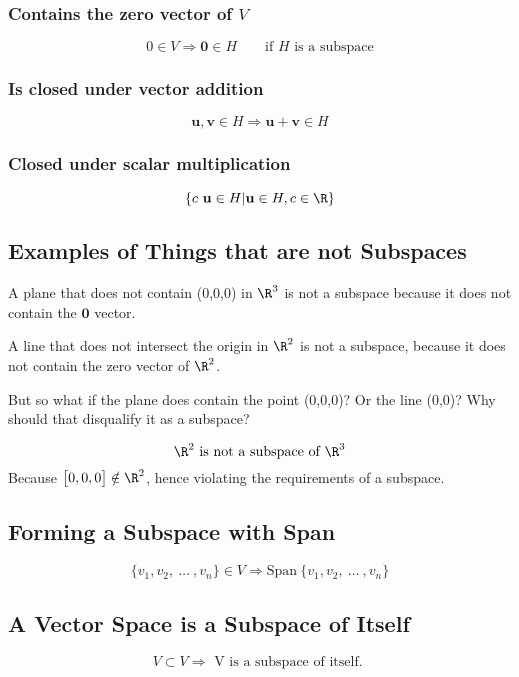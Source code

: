 \documentclass{article}
\begin{document}
\subsubsection{Contains the zero vector of $ V $} 
\[%
    0 \in V \Rightarrow \mathbf{0} \in H \qquad \text{if } H \text{ is a subspace}
\]%
\subsubsection{Is closed under vector addition} 
\[%
    \mathbf{u}, \mathbf{v} \in H \Rightarrow \mathbf{u}+ \mathbf{v} \in H
\]%
\subsubsection{Closed under scalar multiplication} 
\[%
    \{ c \ \mathbf{u} \in H | \mathbf{u} \in H, c \in \R \}
\]%

\subsection{Examples of Things that are not Subspaces} 
A plane that does not contain (0,0,0) in $ \R^{3} $ is not a subspace because 
it does not contain the $ \mathbf{0} $ vector.

A line that does not intersect the origin in $ \R^{2} $ is not a subspace, 
because it does not contain the zero vector of $ \R^{2} $. 

%
\qanda
{But so what if the plane does contain the point (0,0,0)? Or the line (0,0)? Why should that disqualify it as a subspace?}
{} 
%

\[%
    \R^{2} \text{ is not a subspace of } \R^{3}
\]%
Because $ \begin{bmatrix} 0, 0, 0 \end{bmatrix} \notin \R^{2}$, hence violating
the requirements of a subspace.

\subsection{Forming a Subspace with Span} 
\[%
    \{ v_1,v_2, \ \ldots \ , v_{n}  \} \in V \Rightarrow  \text{Span}\ \{ v_1,
    v_2, \ \ldots \ , v_{n}  \}
\]%

\subsection{A Vector Space is a Subspace of Itself} 
\[%
    V \subset V \Rightarrow \text{ V is a subspace of itself. } 
\]%
\end{document}
